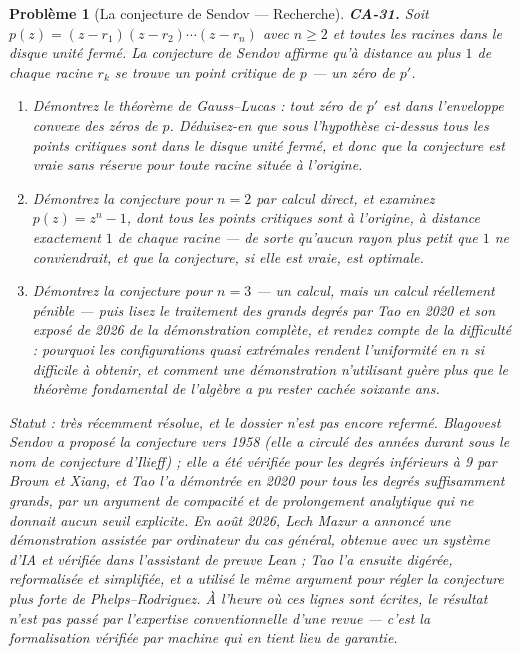 \documentclass[11pt]{article}
\newtheorem{problem}{Problème}
\begin{document}
\begin{problem}[{La conjecture de Sendov --- Recherche}]
\textbf{CA-31.} Soit $ p(z) = (z - r_1)(z - r_2)\cdots(z - r_n) $ avec $ n \ge 2 $ et toutes
les racines dans le disque unité fermé. La conjecture de Sendov affirme qu'à distance au plus
$ 1 $ de chaque racine $ r_k $ se trouve un point critique de $ p $ --- un zéro de
$ p' $.
\begin{enumerate}
\item[(a)] Démontrez le théorème de Gauss--Lucas : tout zéro de $ p' $ est dans l'enveloppe convexe des
zéros de $ p $. Déduisez-en que sous l'hypothèse ci-dessus tous les points critiques sont dans le
disque unité fermé, et donc que la conjecture est vraie sans réserve pour toute racine située à
l'origine.
\item[(b)] Démontrez la conjecture pour $ n = 2 $ par calcul direct, et examinez $ p(z) = z^n - 1 $,
dont tous les points critiques sont à l'origine, à distance exactement $ 1 $ de chaque racine --- de
sorte qu'aucun rayon plus petit que $ 1 $ ne conviendrait, et que la conjecture, si elle est vraie,
est optimale.
\item[(c)] Démontrez la conjecture pour $ n = 3 $ --- un calcul, mais un calcul réellement pénible --- puis
lisez le traitement des grands degrés par Tao en 2020 et son exposé de 2026 de la démonstration
complète, et rendez compte de la difficulté : pourquoi les configurations quasi extrémales rendent
l'uniformité en $ n $ si difficile à obtenir, et comment une démonstration n'utilisant guère plus
que le théorème fondamental de l'algèbre a pu rester cachée soixante ans.
\end{enumerate}
\textit{Statut : très récemment résolue, et le dossier n'est pas encore refermé. Blagovest Sendov a
proposé la conjecture vers 1958 (elle a circulé des années durant sous le nom de conjecture
d'Ilieff) ; elle a été vérifiée pour les degrés inférieurs à 9 par Brown et Xiang, et Tao l'a
démontrée en 2020 pour tous les degrés suffisamment grands, par un argument de compacité et de
prolongement analytique qui ne donnait aucun seuil explicite. En août 2026, Lech Mazur a annoncé une
démonstration assistée par ordinateur du cas général, obtenue avec un système d'IA et vérifiée dans
l'assistant de preuve Lean ; Tao l'a ensuite digérée, reformalisée et simplifiée, et a utilisé le
même argument pour régler la conjecture plus forte de Phelps--Rodriguez. À l'heure où ces lignes sont
écrites, le résultat n'est pas passé par l'expertise conventionnelle d'une revue --- c'est la
formalisation vérifiée par machine qui en tient lieu de garantie.}
\end{problem}
\end{document}

